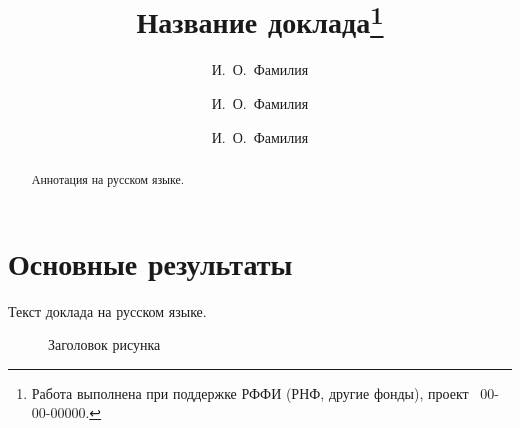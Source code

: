 \documentclass[12pt]{llncs}  %
\begin{document}
%

\title{Название доклада\thanks{Работа выполнена при поддержке РФФИ (РНФ, другие фонды), проект \textnumero~00-00-00000.}}
\author{И.~О.~Фамилия  %
  \and  %
  И.~О.~Фамилия
  \and
  И.~О.~Фамилия
} %


\maketitle

\begin{abstract}
Аннотация на русском языке.

\end{abstract}

\section{Основные результаты} %

Текст доклада на русском языке.


\begin{figure}[htb]
  \centering
  \begin{center}
  \end{center}
  \caption{Заголовок рисунка}\label{fig:example}
\end{figure}
\end{document}
